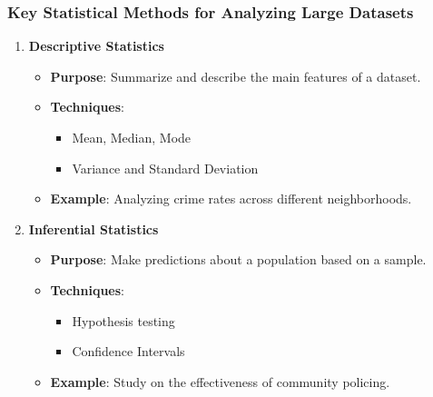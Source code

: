 \documentclass[aspectratio=169]{beamer}
\begin{document}
\begin{frame}
    \frametitle{Key Statistical Methods for Analyzing Large Datasets}
    \begin{enumerate}
        \item \textbf{Descriptive Statistics}
        \begin{itemize}
            \item \textbf{Purpose}: Summarize and describe the main features of a dataset.
            \item \textbf{Techniques}:
            \begin{itemize}
                \item Mean, Median, Mode
                \item Variance and Standard Deviation
            \end{itemize}
            \item \textbf{Example}: Analyzing crime rates across different neighborhoods.
        \end{itemize}
        
        \item \textbf{Inferential Statistics}
        \begin{itemize}
            \item \textbf{Purpose}: Make predictions about a population based on a sample.
            \item \textbf{Techniques}:
            \begin{itemize}
                \item Hypothesis testing
                \item Confidence Intervals
            \end{itemize}
            \item \textbf{Example}: Study on the effectiveness of community policing.
        \end{itemize}
    \end{enumerate}
\end{frame}
\end{document}
